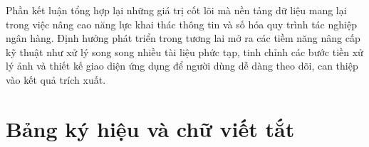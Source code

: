 \documentclass[oneside, a4paper]{book}
\theoremstyle{plain}
\theoremstyle{definition}
\theoremstyle{remark}
\begin{document}
Phần kết luận tổng hợp lại những giá trị cốt lõi mà nền tảng dữ liệu mang lại trong việc nâng cao năng lực khai thác thông tin và số hóa quy trình tác nghiệp ngân hàng. Định hướng phát triển trong tương lai mở ra các tiềm năng nâng cấp kỹ thuật như xử lý song song nhiều tài liệu phức tạp, tinh chỉnh các bước tiền xử lý ảnh và thiết kế giao diện ứng dụng để người dùng dễ dàng theo dõi, can thiệp vào kết quả trích xuất.




\newpage
\tableofcontents %

\newpage
\listoffigures %

\newpage
{}
\hypersetup{bookmarksdepth=-2}
\listoftables %
\hypersetup{bookmarksdepth=3}

\chapter*{Bảng ký hiệu và chữ viết tắt}
\end{document}

